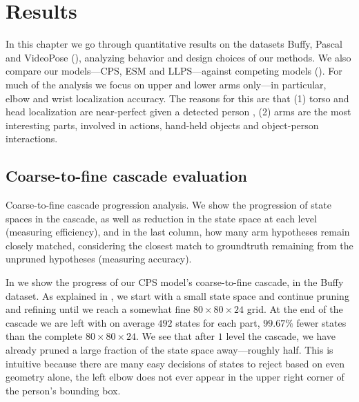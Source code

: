 \chapter{Results}

In this chapter we go through quantitative results on the datasets Buffy, 
Pascal and VideoPose (), analyzing behavior and design choices 
of our methods.  We also compare our models---CPS, ESM and LLPS---against 
competing models ().  For much of the analysis we focus on 
upper and lower arms only---in particular, elbow and wrist localization 
accuracy.  The reasons for this are that (1) torso and head localization are 
near-perfect given a detected person \citep{deva2011}, (2) arms are the most 
interesting parts, involved in actions, hand-held objects and object-person 
interactions.


\section{Coarse-to-fine cascade evaluation}
 \begin{table}[tb]
\begin{center}

\caption[Coarse-to-fine cascade progression analysis.]{Coarse-to-fine cascade 
progression analysis. We show the progression of state spaces in the cascade, 
as well as reduction in the state space at each level (measuring efficiency), 
and in the last column, how many arm hypotheses remain closely matched, 
considering the closest match to groundtruth remaining from the unpruned 
hypotheses (measuring accuracy). }
\label{tab:c2f} 
\end{center}
\end{table}

In  we show the progress of our CPS model's coarse-to-fine cascade, 
in the Buffy dataset.
As explained in , we start with a small state space and 
continue pruning and refining until we reach a somewhat fine $80 \times 80 
\times 24$ grid.  At the end of the cascade we are left with on average $492$ 
states for each part, $99.67\%$ fewer states than the complete $80 \times 80 
\times 24$. We see that after $1$ level the cascade, we have already pruned a 
large fraction of the state space away---roughly half.  This is intuitive 
because there are many easy decisions of states to reject based on even 
geometry alone, \eg the left elbow does not ever appear in the upper right 
corner of the person's bounding box.

